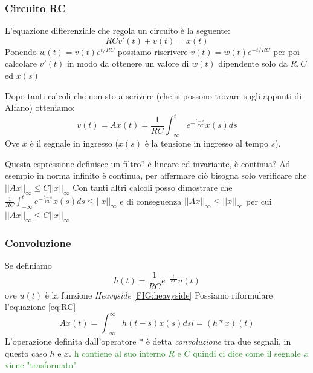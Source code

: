 \documentclass[a4paper]{article}
\newcommand{\appunto}[1]{\textcolor{ForestGreen}{#1}}
\begin{document}
\subsubsection{Circuito RC}
\label{sec:circuito_rc}
L'equazione differenziale che regola un circuito è la seguente:
\begin{equation}\label{eq:RC_definition}
RCv'(t) + v(t) = x(t)
\end{equation}
Ponendo $w(t)=v(t)e^{t/RC}$ possiamo riscrivere $v(t)=w(t)e^{-t/RC}$ per poi calcolare $v'(t)$ in modo da ottenere un valore di $w(t)$ dipendente solo da $R,C$ ed $x(s)$

Dopo tanti calcoli che non sto a scrivere (che si possono trovare sugli appunti di Alfano) otteniamo:
\begin{equation} \label{eq:RC}
v(t) = Ax(t)= \frac{1}{RC}\int^t_{-\infty} e ^{-\frac{t-s}{RC}}x(s)ds
\end{equation}
Ove $x$ è il segnale in ingresso ($x(s)$ è la tensione in ingresso al tempo $s$).

Questa espressione definisce un filtro? è lineare ed invariante, è continua?
Ad esempio in norma infinito è continua, per affermare ciò bisogna solo verificare che $||Ax||_{\infty} \leq C||x||_{\infty}$
Con tanti altri calcoli posso dimostrare che 
$\frac{1}{RC}\int^t_{-\infty} e ^{-\frac{t-s}{RC}}x(s)ds \leq ||x||_{\infty}$ e di conseguenza $||Ax||_{\infty} \leq ||x||_{\infty}$ per cui $||Ax||_{\infty} \leq C||x||_{\infty}$

\subsubsection{Convoluzione}
Se definiamo
$$h(t)= \frac{1}{RC}e^{-\frac{t}{RC}}u(t)$$
ove $u(t)$ è la funzione \textit{Heavyside} \ref{FIG:heavyside}
Possiamo riformulare l'equazione \ref{eq:RC}
$$Ax(t) = \int^{\infty}_{-\infty}h(t-s)x(s)dsi=(h*x)(t)$$
L'operazione definita dall'operatore $*$ è detta \textit{convoluzione} tra due segnali, in questo caso $h$ e $x$. \appunto{h contiene al suo interno $R$ e $C$ quindi ci dice come il segnale $x$ viene "trasformato"}
\end{document}
